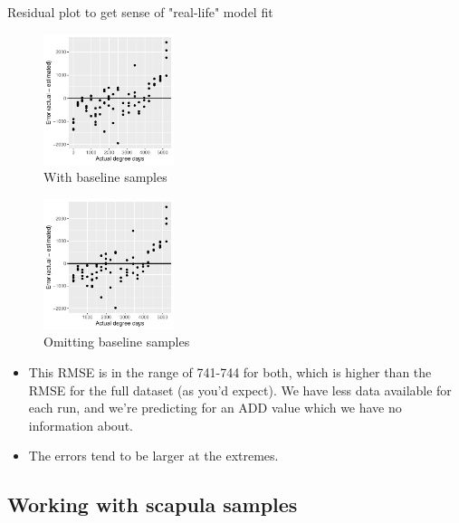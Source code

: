\documentclass{beamer}
\begin{document}
\begin{frame}{Residual plot to get sense of "real-life" model fit}

  \begin{minipage}{0.47\textwidth}
  \begin{figure}
      \includegraphics[width=1.5in]{HenleyLake/bacteria/use_families/w_ribs/w_baseline/leave_out_one_rib_and_one_day_residuals}
      \caption{With baseline samples}
  \end{figure}
  \end{minipage}  
  \begin{minipage}{0.47\textwidth}
  \begin{figure}
      \includegraphics[width=1.5in]{HenleyLake/bacteria/use_families/w_ribs/no_baseline/leave_out_one_rib_and_one_day_residuals}
      \caption{Omitting baseline samples}
  \end{figure}
  \end{minipage}
    \vspace{0.1in}
{\scriptsize
\begin{itemize}
  \item This RMSE is in the range of 741-744 for both, which is
    higher than the RMSE for the full dataset (as you'd expect).  We
    have less data available for each run, and we're predicting for an
    ADD value which we have no information about.
  \item The errors tend to be larger at the extremes.
\end{itemize}
}

\end{frame}



\subsection[Scapulae]{Working with scapula samples}
\end{document}
